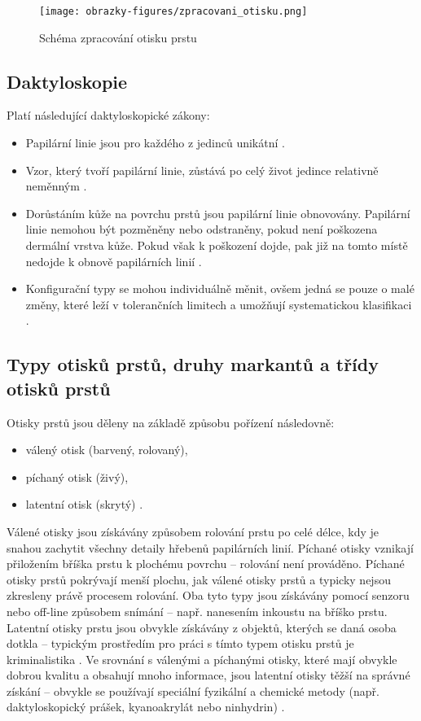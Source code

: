 \begin{figure}[!htbp]
    \centering
    \texttt{[image: obrazky-figures/zpracovani\_otisku.png]}
    \caption{Schéma zpracování otisku prstu \cite{BIOopora}}
    \label{fig:zpracovani}
\end{figure}

\subsection{Daktyloskopie}
Platí následující daktyloskopické zákony:
\begin{itemize}
    \item Papilární linie jsou pro každého z jedinců unikátní \cite{BIOopora}.
    \item Vzor, který tvoří papilární linie, zůstává po celý život jedince relativně neměnným \cite{BIOopora}. 
    \item Dorůstáním kůže na povrchu prstů jsou papilární linie obnovovány. Papilární linie nemohou být pozměněny nebo odstraněny, pokud není poškozena dermální vrstva kůže. Pokud však k poškození dojde, pak již na tomto místě nedojde k obnově papilárních linií \cite{BIOopora}.
    \item Konfigurační typy se mohou individuálně měnit, ovšem jedná se pouze o malé změny, které leží v tolerančních limitech a umožňují systematickou klasifikaci \cite{BIOopora}.
\end{itemize}
\subsection{Typy otisků prstů, druhy markantů a třídy otisků prstů}
Otisky prstů jsou děleny na základě způsobu pořízení následovně:
\begin{itemize}
\item válený otisk (barvený, rolovaný),
\item píchaný otisk (živý),
\item latentní otisk (skrytý) \cite{BIOopora}.
\end{itemize}

Válené otisky jsou získávány způsobem rolování prstu po celé délce, kdy je snahou zachytit všechny detaily hřebenů papilárních linií. Píchané otisky vznikají přiložením bříška prstu k plochému povrchu -- rolování není prováděno. Píchané otisky prstů pokrývají menší plochu, jak válené otisky prstů a typicky nejsou zkresleny právě procesem rolování. Oba tyto typy jsou získávány pomocí senzoru nebo off-line způsobem snímání -- např. nanesením inkoustu na bříško prstu. Latentní otisky prstu jsou obvykle získávány z objektů, kterých se daná osoba dotkla -- typickým prostředím pro práci s tímto typem otisku prstů je kriminalistika \cite{LatentFingerprintMatching}. Ve srovnání s válenými a píchanými otisky, které mají obvykle dobrou kvalitu a obsahují mnoho informace, jsou latentní otisky těžší na správné získání -- obvykle se používají speciální fyzikální a chemické metody (např. daktyloskopický prášek, kyanoakrylát nebo ninhydrin) \cite{BIOdaktylLecture}.\\

